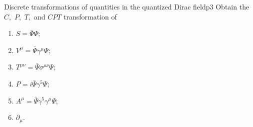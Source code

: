 \begin{problem}{Discrete transformations of quantities in the quantized Dirac field}{p3}
   Obtain the \(C,\) \(P,\) \(T,\) and \(CPT\) transformation of
   \begin{enumerate}[label=(\alph*)]
      \item \(S = \bar{\Psi} \Psi\);
      \item \(V^\mu = \bar{\Psi} \gamma^\mu \Psi\);
      \item \(T^{\mu\nu} = \bar{\Psi} \sigma^{\mu \nu} \Psi\);
      \item \(P = i \bar{\Psi} \gamma^5 \Psi\);
      \item \(A^\mu = \bar{\Psi} \gamma^5 \gamma^\mu \Psi\);
      \item \(\partial_\mu.\)
   \end{enumerate}
\end{problem}
